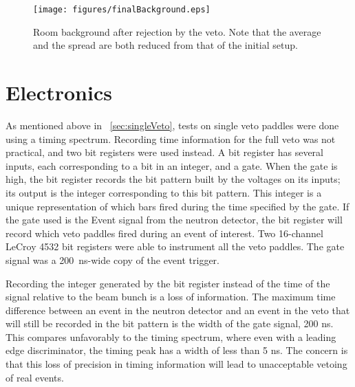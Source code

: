 \begin{figure}[htp]
\centering
\texttt{[image: figures/finalBackground.eps]}
\caption{Room background after rejection by the veto.  Note that the average and the spread are both reduced from that of the initial setup.}
\label{fig:finalBackground}
\end{figure}

\section{Electronics}

As mentioned above in {\sect}~\ref{sec:singleVeto}, tests on single veto paddles were done using a timing spectrum.  Recording time information for the full veto was not practical, and two bit registers were used instead.  A bit register has several inputs, each corresponding to a bit in an integer, and a gate.  When the gate is high, the bit register records the bit pattern built by the voltages on its inputs; its output is the integer corresponding to this bit pattern.  This integer is a unique representation of which bars fired during the time specified by the gate.  If the gate used is the Event signal from the neutron detector, the bit register will record which veto paddles fired during an event of interest.  Two 16-channel LeCroy 4532 bit registers were able to instrument all the veto paddles.  The gate signal was a 200~ns-wide copy of the event trigger.

Recording the integer generated by the bit register instead of the time of the signal relative to the beam bunch is a loss of information.  The maximum time difference between an event in the neutron detector and an event in the veto that will still be recorded in the bit pattern is the width of the gate signal, 200 ns.  This compares unfavorably to the timing spectrum, where even with a leading edge discriminator, the timing peak has a width of less than 5 ns.  The concern is that this loss of precision in timing information will lead to unacceptable vetoing of real events.  

